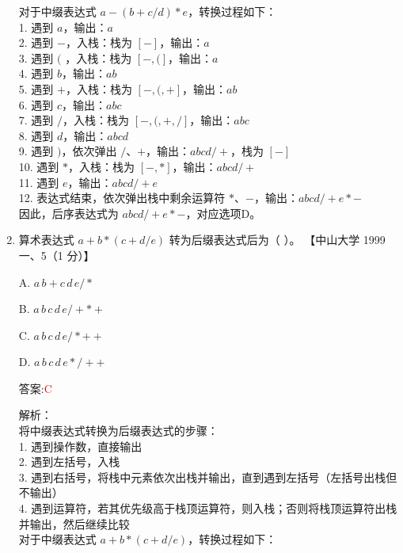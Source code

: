 \documentclass[lang=cn,newtx,10pt,scheme=chinese]{../../../elegantbook}
\begin{document}
\begin{enumerate}
    对于中缀表达式 $a - (b + c/d) \ast e$，转换过程如下：\\
    
    1. 遇到 $a$，输出：$a$\\
    2. 遇到 $-$，入栈：栈为 $[-]$，输出：$a$\\
    3. 遇到 $($ ，入栈：栈为 $[-, (]$，输出：$a$\\
    4. 遇到 $b$，输出：$a b$\\
    5. 遇到 $+$，入栈：栈为 $[-, (, +]$，输出：$a b$\\
    6. 遇到 $c$，输出：$a b c$\\
    7. 遇到 $/$，入栈：栈为 $[-, (, +, /]$，输出：$a b c$\\
    8. 遇到 $d$，输出：$a b c d$\\
    9. 遇到 $)$，依次弹出 $/$、$+$，输出：$a b c d / +$，栈为 $[-]$\\
    10. 遇到 $*$，入栈：栈为 $[-, *]$，输出：$a b c d / +$\\
    11. 遇到 $e$，输出：$a b c d / + e$\\
    12. 表达式结束，依次弹出栈中剩余运算符 $*$、$-$，输出：$a b c d / + e * -$\\
    
    因此，后序表达式为 $a b c d / + e * -$，对应选项D。\\  

    \item 算术表达式 $a + b \ast (c + d / e)$ 转为后缀表达式后为（ ）。  
    【中山大学 1999 一、5（1 分）】  

    A. $a \, b + c \, d \, e / *$  

    B. $a \, b \, c \, d \, e /+ \ast +$ 

    C. $a \, b \, c \, d \, e / \ast + +$  

    D. $a \, b \, c \, d \, e \ast / + +$  
    
    答案:\textcolor{red}{C}
    
    解析：\\
    将中缀表达式转换为后缀表达式的步骤：\\
    1. 遇到操作数，直接输出\\
    2. 遇到左括号，入栈\\
    3. 遇到右括号，将栈中元素依次出栈并输出，直到遇到左括号（左括号出栈但不输出）\\
    4. 遇到运算符，若其优先级高于栈顶运算符，则入栈；否则将栈顶运算符出栈并输出，然后继续比较\\
    
    对于中缀表达式 $a + b \ast (c + d / e)$，转换过程如下：\\
    

\end{enumerate}
\end{document}
